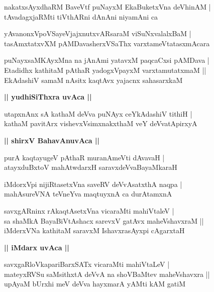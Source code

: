 \documentclass[twoside,12pt,openright]{book}
\newcounter{shloka}[chapter]
\def\uvaca#1{\centerline{{\large\textbf{#1}}}}
\begin{document}
\begin{shloka}%
nakatxsAyxdhaRM BaveVtf puNayxM EkaBuketxVna deVhinAM |\\
tAvadagxjaRMti tiVthARni dAnAni niyamAni ca
\end{shloka}

\begin{shloka}%
yAvanonxVpoVSayeVjajxnutxvARsaraM viSuNxvalalxBaM |\\
tasAmxtatxvXM pAMDavasherxVSaThx varxtameVtatasxmAcara
\end{shloka}

\begin{shloka}%
puNayxsaMKAyxMna na jAnAmi yatavxM paqcaCxsi pAMDava |\\
Etadidhx kathitaM pAthaR yadogxVpayxM varxtamutatxmaM ||\\
EkAdashiV samaM nAsitx kaqtAvx yajacnx sahasarxkaM
\end{shloka}

\uvaca{|| yudhiSiThxra uvAca ||}

\begin{shloka}%
utapxnAnx sA kathaM deVva puNAyx ceYkAdashiV tithiH |\\
kathaM pavitArx vishevxVsimxnakxthaM veY deVvatApirxyA
\end{shloka}

\uvaca{|| shirxV BahavAnuvAca ||}

\begin{shloka}%
purA kaqtayugeV pAthaR muranAmeVti dAvavaH |\\
atayxduBxtoV mahAtwdarxH saravxdeVvaBayaMkaraH
\end{shloka}

\begin{shloka}%
iMdorxVpi nijiRtasetxVna saveRV deVvAsatxthA naqpa |\\
mahAsureVNA teVneYva maqtuyxnA ca durAtamxnA
\end{shloka}

\begin{shloka}%
savxgARninx rAkaqtAsetxVna vicaraMti mahiVtaleV |\\
sa shaMkA BayaBiVtAshacx sarevxV gatAvx maheVshavxraM ||\\
iMderxVNa kathitaM saravxM IshavxrasAyxpi cAgarxtaH
\end{shloka}

\uvaca{|| iMdarx uvAca ||}

\begin{shloka}%
savxgaRloVkapariBarxSATx vicaraMti mahiVtaLeV |\\
mateyxRVSu saMsithxtA deVvA na shoVBaMtev maheVshavxra ||\\
upAyaM bUrxhi meV deVva hayxmarA yAMti kAM gatiM
\end{shloka}
\end{document}
